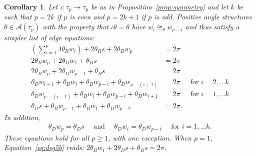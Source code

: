 \documentclass[reqno]{amsart}
\theoremstyle{plain}
\newtheorem{cor}[thm]{Corollary}
\theoremstyle{definition}
\begin{document}
\begin{cor}\label{cor:symmetryedgeeqs}
Let $\iota:\tau_{p}\rightarrow\tau_{p}$ be as in Proposition~\ref{prop:symmetry} and let $k$ be such that $p=2k$ if $p$ is even and $p=2k+1$ if $p$ is odd.  Positive angle structures $\theta\in\mathcal A(\tau_{p})$ with the property that $\iota\theta=\theta$ have $w_i^\prime\cong_\theta w_{p-i}$ and thus satisfy a simpler list of edge equations: 
\begin{align}
\left(\sum_{i=1}^{p} 4\theta_R w_i\right) +2\theta_R s + 2\theta_Dw_p&=2\pi\label{eq:deg4p+4}\\
2\theta_B w_p+2\theta_D w_1+\theta_B s&=2\pi\label{eq:deg5a}\\
2\theta_B w_p+2\theta_D w_{p-1}+\theta_B s&=2\pi\label{eq:deg5b}\\
\theta_D w_{i-1}+\theta_B w_{i}+\theta_B w_{p-i}+\theta_D  w_{p-(i+1)}&=2\pi&\text{ for } i=2, \dots k\label{eq:deg4a}\\
\theta_D w_{p-(i-1)}+\theta_B w_{i}+\theta_B w_{p-i}+\theta_D  w_{i+1}&=2\pi&\text{ for } i=1, \dots k\label{eq:deg4b}\\
\theta_D s+\theta_B w_{p-1}+\theta_B w_1+\theta_D  w_{p-2}&=2\pi.\label{eq:deg4c}
\end{align}
In addition,
\begin{align}
 \theta_D w_p=\theta_D s\quad\text{ and }\quad\theta_D w_i=\theta_D w_{p-i} \quad\text{ for } i=1, \dots k.\label{eq:diagonals}
\end{align}
These equations hold for all $p\ge1$, with one exception.  When $p=1$, Equation~\eqref{eq:deg5b} reads:
$
2\theta_B w_1+2\theta_D s+\theta_B s=2\pi.
$
\end{cor}
\end{document}
